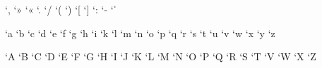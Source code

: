 \XeTeXcharclass `, \charKomma
\XeTeXcharclass `» \charGui
\XeTeXcharclass `« \charGui
\XeTeXcharclass `. \charPunkt
\XeTeXcharclass `/ \charSlash
\XeTeXcharclass `( \charParens	
\XeTeXcharclass `) \charParens
\XeTeXcharclass `[ \charParens
\XeTeXcharclass `] \charParens
\XeTeXcharclass `: \charColon
\XeTeXcharclass `- \charDivis
\XeTeXcharclass `ˈ \charKzg

\XeTeXcharclass `a \chara
\XeTeXcharclass `b \charb
\XeTeXcharclass `c \charc
\XeTeXcharclass `d \chard
\XeTeXcharclass `e \chare
\XeTeXcharclass `f \charf
\XeTeXcharclass `g \charg
\XeTeXcharclass `h \charh
\XeTeXcharclass `i \chari
\XeTeXcharclass `k \chark
\XeTeXcharclass `l \charl
\XeTeXcharclass `m \charm
\XeTeXcharclass `n \charn
\XeTeXcharclass `o \charo
\XeTeXcharclass `p \charp
\XeTeXcharclass `q \charq
\XeTeXcharclass `r \charr
\XeTeXcharclass `s \chars
\XeTeXcharclass `t \chart
\XeTeXcharclass `u \charu
\XeTeXcharclass `v \charv
\XeTeXcharclass `w \charw
\XeTeXcharclass `x \charx
\XeTeXcharclass `y \chary
\XeTeXcharclass `z \charz

\XeTeXcharclass `A \charA
\XeTeXcharclass `B \charB
\XeTeXcharclass `C \charC
\XeTeXcharclass `D \charD
\XeTeXcharclass `E \charE
\XeTeXcharclass `F \charF
\XeTeXcharclass `G \charG
\XeTeXcharclass `H \charH
\XeTeXcharclass `I \charI
\XeTeXcharclass `J \charJ
\XeTeXcharclass `K \charK
\XeTeXcharclass `L \charL
\XeTeXcharclass `M \charM
\XeTeXcharclass `N \charN
\XeTeXcharclass `O \charO
\XeTeXcharclass `P \charP
\XeTeXcharclass `Q \charQ
\XeTeXcharclass `R \charR
\XeTeXcharclass `S \charS
\XeTeXcharclass `T \charT
\XeTeXcharclass `V \charV
\XeTeXcharclass `W \charW
\XeTeXcharclass `X \charX
\XeTeXcharclass `Z \charZ

%
%

